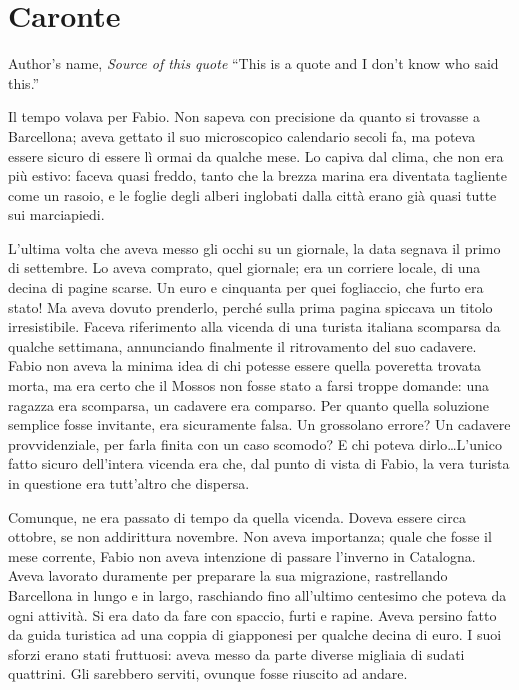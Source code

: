 \chapter{Caronte}

\begin{chapquote}{Author's name, \textit{Source of this quote}}
``This is a quote and I don't know who said this.''
\end{chapquote}


Il tempo volava per Fabio. Non sapeva con precisione da quanto si trovasse a Barcellona; aveva gettato il suo microscopico calendario secoli fa, ma poteva essere sicuro di essere lì ormai da qualche mese. Lo capiva dal clima, che non era più estivo: faceva quasi freddo, tanto che la brezza marina era diventata tagliente come un rasoio, e le foglie degli alberi inglobati dalla città erano già quasi tutte sui marciapiedi.

L'ultima volta che aveva messo gli occhi su un giornale, la data segnava il primo di settembre. Lo aveva comprato, quel giornale; era un corriere locale, di una decina di pagine scarse. Un euro e cinquanta per quei fogliaccio, che furto era stato! Ma aveva dovuto prenderlo, perché sulla prima pagina spiccava un titolo irresistibile. Faceva riferimento alla vicenda di una turista italiana scomparsa da qualche settimana, annunciando finalmente il ritrovamento del suo cadavere. Fabio non aveva la minima idea di chi potesse essere quella poveretta trovata morta, ma era certo che il Mossos non fosse stato a farsi troppe domande: una ragazza era scomparsa, un cadavere era comparso. Per quanto quella soluzione semplice fosse invitante, era sicuramente falsa. Un grossolano errore? Un cadavere provvidenziale, per farla finita con un caso scomodo? E chi poteva dirlo\ldots L'unico fatto sicuro dell'intera vicenda era che, dal punto di vista di Fabio, la vera turista in questione era tutt'altro che dispersa.

Comunque, ne era passato di tempo da quella vicenda. Doveva essere circa ottobre, se non addirittura novembre. Non aveva importanza; quale che fosse il mese corrente, Fabio non aveva intenzione di passare l'inverno in Catalogna. Aveva lavorato duramente per preparare la sua migrazione, rastrellando Barcellona in lungo e in largo, raschiando fino all'ultimo centesimo che poteva da ogni attività. Si era dato da fare con spaccio, furti e rapine. Aveva persino fatto da guida turistica ad una coppia di giapponesi per qualche decina di euro. I suoi sforzi erano stati fruttuosi: aveva messo da parte diverse migliaia di sudati quattrini. Gli sarebbero serviti, ovunque fosse riuscito ad andare. 

